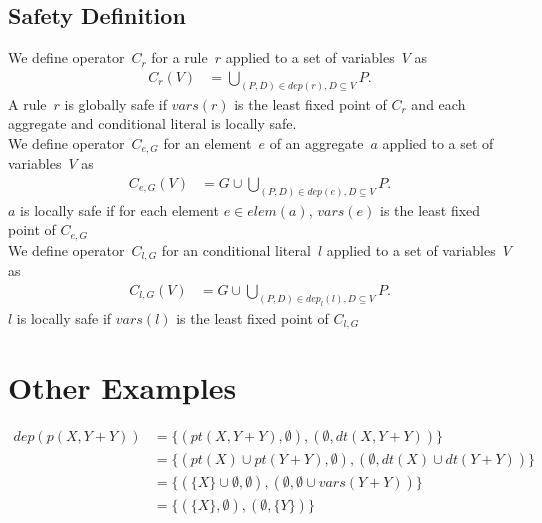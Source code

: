 \documentclass{article}
\newcommand{\set}[1]{\{#1\}}
\newcommand{\dep}[2]{\{(#1), (#2)\}}
\newcommand\Vars{\mathit{vars}}
\newcommand\Provide{\mathit{pt}}
\newcommand\Depend{\mathit{dt}}
\newcommand\DP[1]{\mathit{dep}(#1)}
\newcommand\CheckOp[1]{C_{#1}}
\newcommand\CheckAp[2]{\CheckOp{#1}({#2})}
\begin{document}
	\subsection{Safety Definition}
	We define operator~$\CheckOp{r}$ for a rule~$r$ applied to a set of variables~$V$ as
	\begin{align*}
	\CheckAp{r}{V} &= \bigcup_{(P,D) \in \DP{r}, D \subseteq V} P.
	\end{align*}
	A rule~$r$ is globally safe if $\Vars(r)$ is the least fixed point of $\CheckOp{r}$ and each aggregate and conditional literal is locally safe.
	\\
	We define operator~$\CheckOp{e,G}$ for an element~$e$ of an aggregate~$a$ applied to a set of variables~$V$ as
	\begin{align*}
		\CheckAp{e,G}{V} &= G \cup \bigcup_{(P,D) \in \DP{e}, D \subseteq V} P.
	\end{align*}
	$a$ is locally safe if for each element $e \in elem(a)$, $\Vars(e)$ is the least fixed point of $\CheckOp{e,G}$
	\\
	We define operator~$\CheckOp{l,G}$ for an conditional literal~$l$ applied to a set of variables~$V$ as
	\begin{align*}
		\CheckAp{l,G}{V} &= G \cup \bigcup_{(P,D) \in dep_l(l), D \subseteq V} P.
	\end{align*}
	$l$ is locally safe if $\Vars(l)$ is the least fixed point of $\CheckOp{l,G}$
	\section{Other Examples}
	\begin{align*}
		dep(p(X,Y+Y)) &= \dep{\Provide(X,Y+Y), \emptyset}{\emptyset, \Depend(X,Y+Y)}
		\\ &= \dep{\Provide(X) \cup \Provide(Y+Y), \emptyset}{\emptyset, \Depend(X) \cup \Depend(Y+Y)}
		\\ &= \dep{\set{X} \cup \emptyset, \emptyset}{\emptyset, \emptyset \cup vars(Y+Y)}
		\\ &= \dep{\set{X}, \emptyset}{\emptyset, \set{Y}}
	\end{align*}
\end{document}
